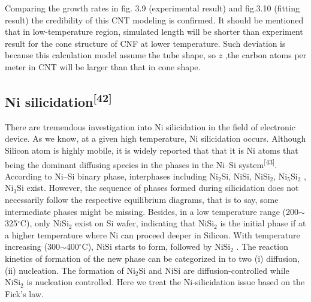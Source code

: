 Comparing the growth rates in fig. 3.9 (experimental result) and fig.3.10 (fitting result) the credibility of this CNT modeling is confirmed. It should be mentioned that in low-temperature region,  simulated length will be shorter than experiment result for the cone structure of CNF at lower temperature. Such deviation is because this calculation model assume  the tube shape, so $z$ ,the carbon atoms per meter in CNT will be larger than that in cone shape. 

\subsection{Ni silicidation\textsuperscript{[42]}}
There are tremendous investigation  into Ni silicidation in the field of electronic device. As we know, at a given high temperature, Ni silicidation occurs. Although Silicon atom is highly mobile, it is widely reported that that it is Ni atoms that being the dominant diffusing species in the phases in the Ni–Si system\textsuperscript{[43]}. According to Ni–Si binary phase, interphases including $\mathrm{Ni_{2}Si}$, $\mathrm{NiSi}$, $\mathrm{NiSi_{2}}$, $\mathrm{Ni_{5}Si_{2}}$ , $\mathrm{Ni_{3}Si}$ exist. However, the sequence of phases formed during silicidation does not necessarily follow the respective equilibrium diagrams, that is to say, some intermediate phases might be missing. Besides, in a low temperature range (200$\sim$325\(^\circ\)C), only $\mathrm{NiSi_{2}}$ exist on Si wafer, indicating that $\mathrm{NiSi_{2}}$ is the initial phase if at a higher temperature where Ni can proceed deeper in Silicon. With temperature increasing (300$\sim$400\(^\circ\)C), $\mathrm{NiSi}$  starts to form, followed by $\mathrm{NiSi_{2}}$ . The reaction kinetics of formation of the new phase can be categorized in to two (i) diffusion, (ii) nucleation. The formation of $\mathrm{Ni_{2}Si}$ and $\mathrm{NiSi}$ are diffusion-controlled while $\mathrm{NiSi_{2}}$  is nucleation controlled. 
Here we treat the Ni-silicidation issue based on the Fick’s law.

